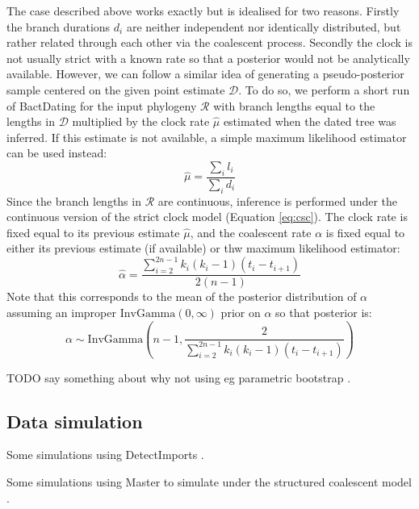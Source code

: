 \documentclass{article}
\begin{document}
The case described above works exactly but is idealised for two reasons.
Firstly the branch durations $d_i$ are neither independent nor identically distributed,
but rather related through each other via the coalescent process. Secondly
the clock is not usually strict with a known rate so that
a posterior would not be analytically available. 
However, we can follow
a similar idea of generating a pseudo-posterior sample centered on the given
point estimate $\mathcal{D}$. To do so, we perform a short run of BactDating \citep{Didelot2018}
for the input phylogeny $\mathcal{R}$ 
with branch lengths equal to
the lengths in $\mathcal{D}$ multiplied by the clock rate 
$\hat \mu$ estimated when the dated tree was inferred. 
If this estimate is not available, a simple maximum likelihood
estimator can be used instead: 
\begin{equation}
\hat \mu = \frac{\sum_i l_i}{\sum_i d_i}
\end{equation}
Since the branch lengths in $\mathcal{R}$ are continuous, 
inference is performed under the 
continuous version of the strict clock model (Equation \ref{eq:csc}).  
The clock rate is fixed equal to its previous estimate $\hat \mu$, and the coalescent rate $\alpha$
is fixed equal to either its previous estimate (if available) or
thw maximum likelihood estimator:
\begin{equation}
\hat \alpha = \frac{\sum_{i=2}^{2n-1}k_i (k_i-1)(t_i-t_{i+1})}{2(n-1)}
\end{equation}
Note that this corresponds to the mean of the posterior distribution of $\alpha$ 
assuming an improper $\mathrm{InvGamma}(0,\infty)$ prior on $\alpha$ so that posterior is:
\begin{equation}
\alpha \sim \mathrm{InvGamma}\left(n-1, \frac{2}{\sum_{i=2}^{2n-1}k_i (k_i-1)(t_i-t_{i+1})}\right)
\end{equation}

TODO say something about why not using eg 
parametric bootstrap \citep{efronBayesianInferenceParametric2012}.

\subsection*{Data simulation}

Some simulations using DetectImports \citep{Didelot2022detectimports}.

Some simulations using Master \citep{Vaughan2013} to simulate under the structured coalescent model \citep{Nordborg1997}.
\end{document}
